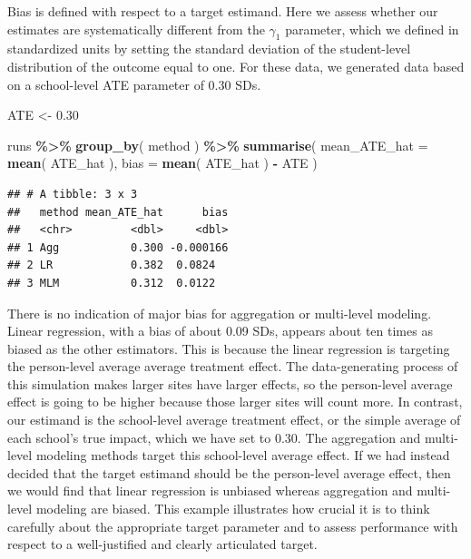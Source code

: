 \documentclass[
]{book}
\newenvironment{Shaded}{\begin{snugshade}}{\end{snugshade}}
\newcommand{\AttributeTok}[1]{\textcolor[rgb]{0.13,0.29,0.53}{#1}}
\newcommand{\FloatTok}[1]{\textcolor[rgb]{0.00,0.00,0.81}{#1}}
\newcommand{\FunctionTok}[1]{\textcolor[rgb]{0.13,0.29,0.53}{\textbf{#1}}}
\newcommand{\NormalTok}[1]{#1}
\newcommand{\OtherTok}[1]{\textcolor[rgb]{0.56,0.35,0.01}{#1}}
\newcommand{\SpecialCharTok}[1]{\textcolor[rgb]{0.81,0.36,0.00}{\textbf{#1}}}
\begin{document}
Bias is defined with respect to a target estimand.
Here we assess whether our estimates are systematically different from the \(\gamma_1\) parameter, which we defined in standardized units by setting the standard deviation of the student-level distribution of the outcome equal to one.
For these data, we generated data based on a school-level ATE parameter of 0.30 SDs.

\begin{Shaded}
\begin{Highlighting}[]
\NormalTok{ATE }\OtherTok{\textless{}{-}} \FloatTok{0.30}

\NormalTok{runs }\SpecialCharTok{\%\textgreater{}\%} 
  \FunctionTok{group\_by}\NormalTok{( method ) }\SpecialCharTok{\%\textgreater{}\%}
  \FunctionTok{summarise}\NormalTok{( }
    \AttributeTok{mean\_ATE\_hat =} \FunctionTok{mean}\NormalTok{( ATE\_hat ),}
    \AttributeTok{bias =} \FunctionTok{mean}\NormalTok{( ATE\_hat ) }\SpecialCharTok{{-}}\NormalTok{ ATE}
\NormalTok{  )}
\end{Highlighting}
\end{Shaded}

\begin{verbatim}
## # A tibble: 3 x 3
##   method mean_ATE_hat      bias
##   <chr>         <dbl>     <dbl>
## 1 Agg           0.300 -0.000166
## 2 LR            0.382  0.0824  
## 3 MLM           0.312  0.0122
\end{verbatim}

There is no indication of major bias for aggregation or multi-level modeling.
Linear regression, with a bias of about 0.09 SDs, appears about ten times as biased as the other estimators.
This is because the linear regression is targeting the person-level average average treatment effect.
The data-generating process of this simulation makes larger sites have larger effects, so the person-level average effect is going to be higher because those larger sites will count more.
In contrast, our estimand is the school-level average treatment effect, or the simple average of each school's true impact, which we have set to 0.30.
The aggregation and multi-level modeling methods target this school-level average effect.
If we had instead decided that the target estimand should be the person-level average effect, then we would find that linear regression is unbiased whereas aggregation and multi-level modeling are biased.
This example illustrates how crucial it is to think carefully about the appropriate target parameter and to assess performance with respect to a well-justified and clearly articulated target.
\end{document}
